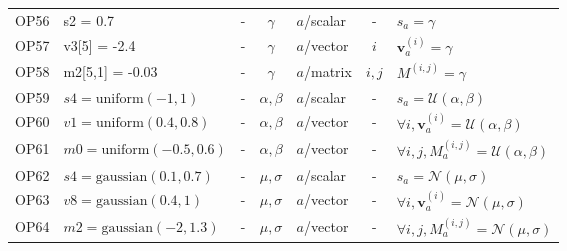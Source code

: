 \documentclass[11pt,oneside,openany,report]{jsbook}
\begin{document}
\begin{center}
{{\begin{longtable}{l|l|lc|lc|l}
        OP56 & s2 = 0.7                                   & -                       & $ \gamma $      & $a$/scalar & -     & $s_a = \gamma $                                                                \\
        OP57 & v3[5] = -2.4                               & -                       & $\gamma$        & $a$/vector & $i$   & $\bm{v}_a^{(i)} = \gamma $                                                     \\
        OP58 & m2[5,1] = -0.03                            & -                       & $\gamma$        & $a$/matrix & $i,j$ & $M^{(i,j)}= \gamma$                                                            \\
        OP59 & $s4 = \mathrm{uniform}(-1,1)$              & -                       & $\alpha, \beta$ & $a$/scalar & -     & $s_a = \mathcal{U}(\alpha, \beta)$                                             \\
        OP60 & $v1 = \mathrm{uniform}(0.4,0.8)$           & -                       & $\alpha, \beta$ & $a$/vector & -     & $\forall i, \bm{v}_a^{(i)} = \mathcal{U}(\alpha, \beta)$                       \\
        OP61 & $m0 = \mathrm{uniform}(-0.5,0.6)$          & -                       & $\alpha, \beta$ & $a$/vector & -     & $\forall i, j, M_a^{(i, j)} = \mathcal{U}(\alpha, \beta)$                      \\
        OP62 & $s4 = \mathrm{gaussian}(0.1,0.7)$          & -                       & $\mu, \sigma$   & $a$/scalar & -     & $s_a = \mathcal{N}(\mu, \sigma)$                                               \\
        OP63 & $v8 = \mathrm{gaussian}(0.4,1)$            & -                       & $\mu, \sigma$   & $a$/vector & -     & $\forall i, \bm{v}_a^{(i)} = \mathcal{N}(\mu, \sigma)$                         \\
        OP64 & $m2 = \mathrm{gaussian}(-2,1.3)$           & -                       & $\mu, \sigma$   & $a$/vector & -     & $\forall i, j, M_a^{(i, j)} = \mathcal{N}(\mu, \sigma)$                        \\
        \hline
      \end{longtable}}}
\end{center}
\end{document}
